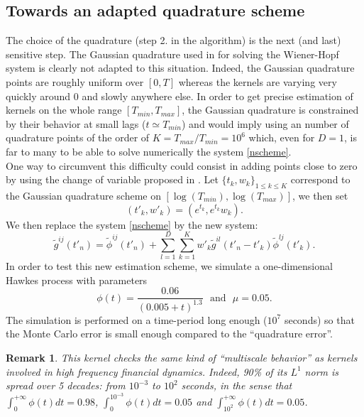 \documentclass[a4paper,11pt]{article}
\newtheorem{remark}{Remark}[section]
\begin{document}

\subsection{Towards an adapted quadrature scheme}
The choice of the quadrature (step 2. in the algorithm) is the next (and last) sensitive step.
The Gaussian quadrature used in \cite{bacry2014second} for solving the Wiener-Hopf system is clearly not adapted to this situation. Indeed,
the Gaussian quadrature points are roughly uniform over $[0,T]$ whereas the kernels are varying very quickly around 0 and slowly anywhere else.
In order to get precise estimation of kernels on the whole range $[T_{min},T_{max}]$, the Gaussian quadrature is constrained by their behavior at small lags ($t \simeq T_{min}$) and would imply using an number of quadrature points of the order of $K=T_{max}/T_{min}=10^6$ which, even for $D=1$, is far to many to be able to solve numerically the system \eqref{nscheme}.\\

\noindent One way to circumvent this difficulty could consist in adding points close to zero by using the change of variable proposed in \cite{sloan1981quadrature}. Let $\{t_k,w_k\}_{1\le k \le K}$ correspond to the Gaussian quadrature scheme on $[\log(T_{min}),\log(T_{max})]$, we then set
\begin{equation}
\label{change}
(t'_k,w'_k)=(e^{t_k},e^{t_k}w_k).
\end{equation}
We then replace the system \eqref{nscheme} by the new
system:
\begin{equation}
\label{whcv}
\tilde g^{ij}(t'_n)=\tilde \phi^{ij}(t'_n)+\sum_{l=1}^D \sum_{k=1}^{K}w'_k\tilde g^{il}(t'_n-t'_k)
\tilde \phi^{lj}(t'_k).
\end{equation}
In order to test this new estimation scheme, we simulate
a one-dimensional Hawkes process with parameters
\begin{equation}
\label{hex}
\phi(t)=\frac{0.06}{(0.005+t)^{1.3}}~~~{\mbox{and}}~~~\mu = 0.05.
\end{equation}
The simulation is performed on a time-period long enough ($10^7$ seconds) so that the Monte Carlo error is small enough compared to the ``quadrature error''.

\begin{remark}
This kernel checks the same kind of ``multiscale behavior'' as kernels involved in high frequency financial dynamics. Indeed, 90\% of its $L^1$ norm is spread over 5 decades: from $10^{-3}$ to $10^2$ seconds, in the sense that $\int_{0}^{+\infty}\phi(t)dt=0.98$, $\int_{0}^{10^{-3}}\phi(t)dt=0.05$ and $\int_{10^2}^{+\infty}\phi(t)dt=0.05$.
\end{remark}
\end{document}
